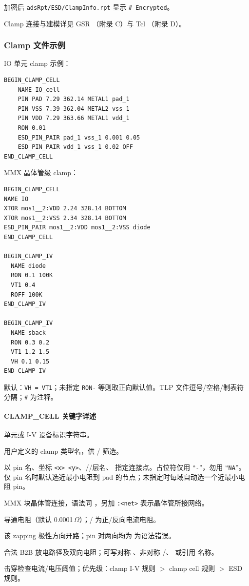 加密后 \texttt{adsRpt/ESD/ClampInfo.rpt} 显示 \texttt{\# Encrypted}。

\begin{seeAlsoBox}
Clamp 连接与建模详见 GSR （附录 C）与 Tcl （附录 D）。
\end{seeAlsoBox}

\subsubsection{Clamp 文件示例}
IO 单元 clamp 示例：
\begin{lstlisting}
BEGIN_CLAMP_CELL
    NAME IO_cell
    PIN PAD 7.29 362.14 METAL1 pad_1
    PIN VSS 7.39 362.04 METAL2 vss_1
    PIN VDD 7.29 363.66 METAL1 vdd_1
    RON 0.01
    ESD_PIN_PAIR pad_1 vss_1 0.001 0.05
    ESD_PIN_PAIR vdd_1 vss_1 0.02 OFF
END_CLAMP_CELL
\end{lstlisting}

MMX 晶体管级 clamp：
\begin{lstlisting}
BEGIN_CLAMP_CELL
NAME IO
XTOR mos1__2:VDD 2.24 328.14 BOTTOM
XTOR mos1__2:VSS 2.34 328.14 BOTTOM
ESD_PIN_PAIR mos1__2:VDD mos1__2:VSS diode
END_CLAMP_CELL

BEGIN_CLAMP_IV
  NAME diode
  RON 0.1 100K
  VT1 0.4
  ROFF 100K
END_CLAMP_IV

BEGIN_CLAMP_IV
  NAME sback
  RON 0.3 0.2
  VT1 1.2 1.5
  VH 0.1 0.15
END_CLAMP_IV
\end{lstlisting}

默认：\texttt{VH = VT1}；未指定 \texttt{RON-} 等则取正向默认值。TLP 文件逗号/空格/制表符分隔；\texttt{\#} 为注释。

\paragraph{CLAMP\_CELL 关键字详述}
\begin{description}[leftmargin=2.8cm,style=nextline]
\item[\kw{NAME}] 单元或 I-V 设备标识字符串。
\item[\kw{TYPE}] 用户定义的 clamp 类型名，供 / 筛选。
\item[\kw{PIN}] 以 pin 名、坐标 \texttt{<x> <y>}、//层名、 指定连接点。占位符仅用 ``\texttt{-}''，勿用 ``\texttt{NA}''。仅 pin 名时默认选近最小电阻到 pad 的节点；未指定时每域自动选一个近最小电阻 pin。
\item[\kw{XTOR}] MMX 块晶体管连接，语法同 ，另加 \texttt{:<net>} 表示晶体管所接网络。
\item[\kw{RON}] 导通电阻（默认 0.0001\,$\Omega$）；/ 为正/反向电流电阻。
\item[\kw{OFF}] 该 zapping 极性方向开路；pin 对两向均为  为语法错误。
\item[\kw{ESD_PIN_PAIR}] 合法 B2B 放电路径及双向电阻；可写对称 、非对称 /、 或引用  名称。
\item[\kw{IMAX}/\kw{VMAX}] 击穿检查电流/电压阈值；优先级：clamp I-V 规则 $>$ clamp cell 规则 $>$ ESD 规则。
\end{description}

